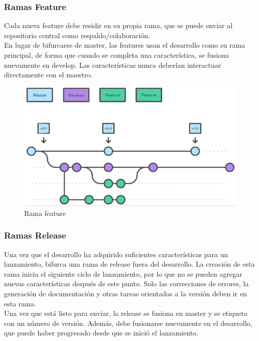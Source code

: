 \subsubsection{Ramas Feature}

\quad Cada nueva feature debe residir en su propia rama, que se puede enviar al repositorio central como respaldo/colaboración.\\

\quad En lugar de bifurcarse de master, las features usan el desarrollo como su rama principal, de forma que cuando se completa una característica, se fusiona nuevamente en develop. Las características nunca deberían interactuar directamente con el maestro.\\

\begin{figure}[htb]
	\centering
	\includegraphics[width=1\textwidth]{./imagenes/feature}
	\caption{Rama feature}
\end{figure}
\FloatBarrier

\subsubsection{Ramas Release}

\quad Una vez que el desarrollo ha adquirido suficientes características para un lanzamiento,  bifurca una rama de release fuera del desarrollo. La creación de esta rama inicia el siguiente ciclo de lanzamiento, por lo que no se pueden agregar nuevas características después de este punto. Solo las correcciones de errores, la generación de documentación y otras tareas orientadas a la versión deben ir en esta rama.\\ 

\quad Una vez que está listo para enviar, la release se fusiona en master y se etiqueta con un número de versión. Además, debe fusionarse nuevamente en el desarrollo, que puede haber progresado desde que se inició el lanzamiento.\\

